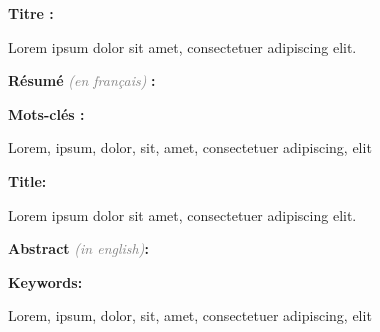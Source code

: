 \documentclass[11pt]{article}
\newcommand{\Gray}[1]{\textcolor{gray}{\textit{#1}}}
\begin{document}
\newpage
\parskip 7pt


{\bfseries Titre :}

Lorem ipsum dolor sit amet, consectetuer adipiscing elit.

{\bfseries Résumé} \Gray{(en français)} {\bfseries :}

\lipsum[1-2]

{\bfseries Mots-clés :}

Lorem, ipsum, dolor, sit, amet, consectetuer adipiscing, elit

\vspace*{3mm}
\hrulefill
\vspace*{3mm}


{\bfseries Title:}

Lorem ipsum dolor sit amet, consectetuer adipiscing elit.

{\bfseries Abstract} \Gray{(in english)}{\bfseries:}

\lipsum[1-2]

{\bfseries Keywords:}

Lorem, ipsum, dolor, sit, amet, consectetuer adipiscing, elit


\end{document}
